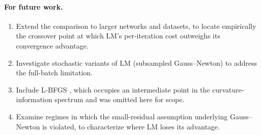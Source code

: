 \documentclass[11pt,letterpaper]{article}
\theoremstyle{definition}
\begin{document}
\paragraph{For future work.}
\begin{enumerate}
  \item Extend the comparison to larger networks and datasets, to locate
    empirically the crossover point at which LM's per-iteration cost
    outweighs its convergence advantage.
  \item Investigate stochastic variants of LM (subsampled Gauss--Newton)
    to address the full-batch limitation.
  \item Include L-BFGS \citep[Ch.~6]{NocedalWright2006}, which occupies an
    intermediate point in the curvature-information spectrum and was
    omitted here for scope.
  \item Examine regimes in which the small-residual assumption underlying
    Gauss--Newton is violated, to characterize where LM loses its
    advantage.
\end{enumerate}
 


 
\end{document}
